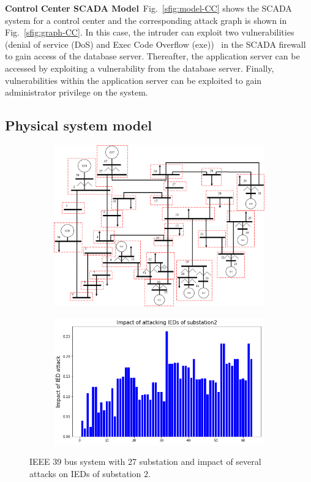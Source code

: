 \noindent\textbf{Control Center SCADA Model}\ 
Fig.~\ref{sfig:model-CC} shows the SCADA system for a control center and the corresponding attack graph is shown in Fig.~\ref{sfig:graph-CC}. In this case, the intruder can exploit two vulnerabilities (denial of service (DoS) and Exec Code Overflow (exe))~\cite{ssh} in the SCADA firewall to gain access of the database server. Thereafter, the application server can be accessed by exploiting a vulnerability from the database server. Finally, vulnerabilities within the application server can be exploited to gain administrator privilege on the system.

\subsection{Physical system model}\label{sec:physical}
\begin{figure}[htbp]
	\centering
	\begin{subfigure}{0.23\textwidth}
	\includegraphics[width=\textwidth]{fig-ieee39.png}
	\caption{}\label{sfig:ieee-39}
	\end{subfigure}
	\begin{subfigure}{0.23\textwidth}
	\includegraphics[width=\textwidth]{fig-sub2.png}
	\caption{}\label{sfig:sub-2}
	\end{subfigure}
	\caption{IEEE 39 bus system with 27 substation and impact of several attacks on IEDs of substation $2$.}
	\label{fig:physical}
\end{figure}

